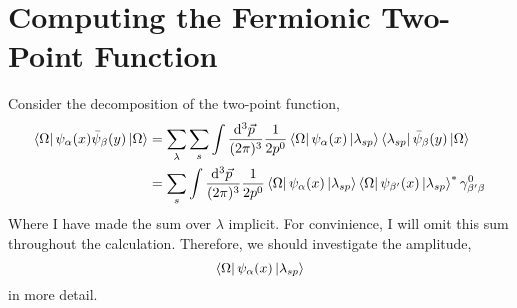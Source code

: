 \documentclass[12pt]{article}
\begin{document}

\section{Computing the Fermionic Two-Point Function}

Consider the decomposition of the two-point function,
\begin{align*}
\left< \Omega \right| \psi_{\alpha}(x) \bar{\psi}_{\beta}(y) \left| \Omega \right> & = \sum_{\lambda} \sum_{s} \int \frac{\mathrm{d}^{3} \vec{p} \:}{(2 \pi)^3} \frac{1}{2 p^0} \left< \Omega \right| \psi_{\alpha}(x) \left| \lambda_{s p} \right> \left< \lambda_{s p} \right| \bar{\psi}_{\beta}(y) \left| \Omega \right> 
\\
& = \sum_{s} \int \frac{\mathrm{d}^{3} \vec{p} \:}{(2 \pi)^3} \frac{1}{2 p^0} \left< \Omega \right| \psi_{\alpha}(x) \left| \lambda_{s p} \right>  \left< \Omega \right| \psi_{\beta'}(x) \left| \lambda_{s p} \right>^* \gamma^0_{\beta' \beta}
\end{align*}
Where I have made the sum over $\lambda$ implicit. For convinience, I will omit this sum throughout the calculation. 
Therefore, we should investigate the amplitude, 
\[  \left< \Omega \right| \psi_{\alpha}(x) \left| \lambda_{s p} \right> \]
in more detail. 
\end{document}
